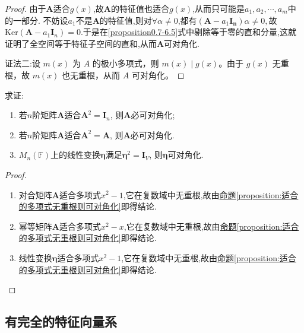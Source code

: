 \documentclass[../../main.tex]{subfiles}%
\begin{document}
\begin{proof}
由于\(\boldsymbol{A}\)适合\(g(x)\),故\(\boldsymbol{A}\)的特征值也适合\(g(x)\),从而只可能是\(a_1,a_2,\cdots,a_m\)中的一部分. 
不妨设$a_1$不是$\boldsymbol{A}$的特征值,则对$\forall \alpha\ne 0$,都有$(\boldsymbol{A}-a_1\boldsymbol{I_n})\alpha \ne 0,$故$\mathrm{Ker}(\boldsymbol{A} - a_1\boldsymbol{I}_n)=0$.于是在\eqref{proposition0.7-6.5}式中剔除等于零的直和分量,这就证明了全空间等于特征子空间的直和,从而\(\boldsymbol{A}\)可对角化.

{\color{blue}证法二:}设 $m(x)$ 为 $A$ 的极小多项式，则 $m(x)\mid g(x)$。由于 $g(x)$ 无重根，故 $m(x)$ 也无重根，从而 $A$ 可对角化。
\end{proof}

\begin{example}\label{example0.7qew}
求证:
\begin{enumerate}[(1)]
\item 若\(n\)阶矩阵\(\boldsymbol{A}\)适合\(\boldsymbol{A}^2 = \boldsymbol{I}_n\), 则\(\boldsymbol{A}\)必可对角化;

\item 若\(n\)阶矩阵\(\boldsymbol{A}\)适合\(\boldsymbol{A}^2 = \boldsymbol{A}\), 则\(\boldsymbol{A}\)必可对角化.

\item \(M_n(\mathbb{F})\)上的线性变换\(\boldsymbol{\eta}\)满足\(\boldsymbol{\eta}^2 = \boldsymbol{I}_V\), 则\(\boldsymbol{\eta}\)可对角化.
\end{enumerate}
\end{example}
\begin{proof}
\begin{enumerate}[(1)]
\item 对合矩阵\(\boldsymbol{A}\)适合多项式\(x^2 - 1\),它在复数域中无重根,故由\hyperref[proposition:适合的多项式无重根则可对角化]{命题\ref{proposition:适合的多项式无重根则可对角化}}即得结论.

\item 幂等矩阵\(\boldsymbol{A}\)适合多项式\(x^2 - x\),它在复数域中无重根,故由\hyperref[proposition:适合的多项式无重根则可对角化]{命题\ref{proposition:适合的多项式无重根则可对角化}}即得结论.

\item 线性变换\(\boldsymbol{\eta}\)适合多项式$x^2-1$,它在复数域中无重根,故由\hyperref[proposition:适合的多项式无重根则可对角化]{命题\ref{proposition:适合的多项式无重根则可对角化}}即得结论.
\end{enumerate}
\end{proof}


\subsection{有完全的特征向量系}
\end{document}
